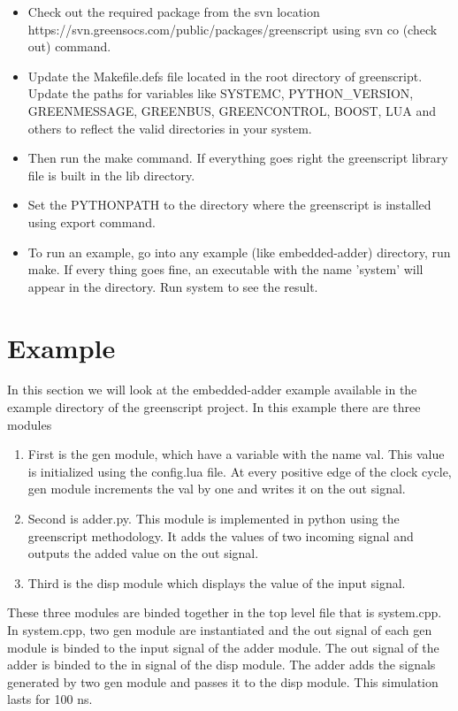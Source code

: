 \documentclass[12pt,oneside]{gsbook}
\begin{document}
\begin{itemize}
\item Check out the required package from the svn location https://svn.greensocs.com/public/packages/greenscript using svn co (check out) command.
\item Update the Makefile.defs file located in the root directory of greenscript. Update the paths for variables like SYSTEMC, PYTHON\_VERSION, GREENMESSAGE, GREENBUS, GREENCONTROL, BOOST, LUA and others to reflect the valid directories in your system.
\item Then run the make command. If everything goes right the greenscript library file is built in the lib directory.
\item Set the PYTHONPATH to the directory where the greenscript is installed using export command.
\item To run an example, go into any example (like embedded-adder) directory, run make. If every thing goes fine, an executable with the name 'system' will appear in the directory. Run system to see the result. 
\end{itemize}

\section{Example}

In this section we will look at the embedded-adder example available in the example directory of the greenscript project. In this example there are three modules

\begin{enumerate}
 \item First is the gen module, which have a variable with the name val. This value is initialized using the config.lua file. At every positive edge of the clock cycle, gen module increments the val by one and writes it on the out signal.
 \item Second is adder.py. This module is implemented in python using the greenscript methodology. It adds the values of two incoming signal and outputs the added value on the out signal.
 \item Third is the disp module which displays the value of the input signal.
\end{enumerate}

These three modules are binded together in the top level file that is system.cpp. In system.cpp, two gen module are instantiated and the out signal of each gen module is binded to the input signal of the adder module. The out signal of the adder is binded to the in signal of the disp module. The adder adds the signals generated by two gen module and passes it to the disp module. This simulation lasts for 100 ns.
\end{document}
